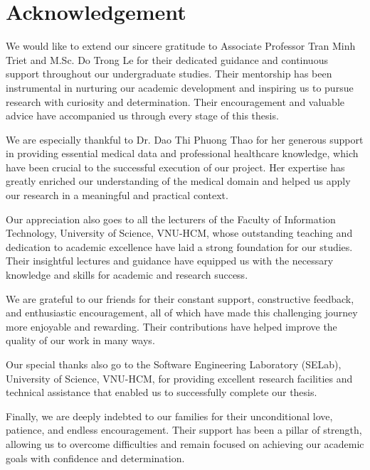 \chapter{Acknowledgement}

We would like to extend our sincere gratitude to Associate Professor Tran Minh Triet and M.Sc. Do Trong Le for their dedicated guidance and continuous support throughout our undergraduate studies. Their mentorship has been instrumental in nurturing our academic development and inspiring us to pursue research with curiosity and determination. Their encouragement and valuable advice have accompanied us through every stage of this thesis.

We are especially thankful to Dr. Dao Thi Phuong Thao for her generous support in providing essential medical data and professional healthcare knowledge, which have been crucial to the successful execution of our project. Her expertise has greatly enriched our understanding of the medical domain and helped us apply our research in a meaningful and practical context.

Our appreciation also goes to all the lecturers of the Faculty of Information Technology, University of Science, VNU-HCM, whose outstanding teaching and dedication to academic excellence have laid a strong foundation for our studies. Their insightful lectures and guidance have equipped us with the necessary knowledge and skills for academic and research success.

We are grateful to our friends for their constant support, constructive feedback, and enthusiastic encouragement, all of which have made this challenging journey more enjoyable and rewarding. Their contributions have helped improve the quality of our work in many ways.

Our special thanks also go to the Software Engineering Laboratory (SELab), University of Science, VNU-HCM, for providing excellent research facilities and technical assistance that enabled us to successfully complete our thesis.

Finally, we are deeply indebted to our families for their unconditional love, patience, and endless encouragement. Their support has been a pillar of strength, allowing us to overcome difficulties and remain focused on achieving our academic goals with confidence and determination.